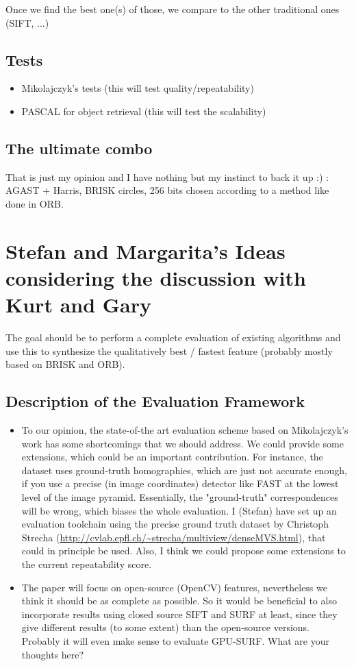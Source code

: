 \documentclass[a4paper,10pt]{article}
\begin{document}
Once we find the best one(s) of those, we compare to the other traditional ones
(SIFT, ...)

\subsection{Tests}

\begin{itemize}
 \item Mikolajczyk's tests (this will test quality/repeatability)
 \item PASCAL for object retrieval (this will test the scalability)
\end{itemize}


\subsection{The ultimate combo}

That is just my opinion and I have nothing but my instinct to back it up :) :
AGAST + Harris, BRISK circles, 256 bits chosen according to a method like done in ORB.

\section{Stefan and Margarita's Ideas considering the discussion with Kurt and Gary}
The goal should be to perform a complete evaluation of existing algorithms and use this to synthesize the qualitatively best / fastest feature (probably mostly based on BRISK and ORB).
\subsection{Description of the Evaluation Framework}
\begin{itemize}
\item To our opinion, the state-of-the art evaluation scheme based on Mikolajczyk's work has some shortcomings that we should address. We could provide some extensions, which could be an important contribution. For instance, the dataset uses ground-truth homographies, which are just not accurate enough, if you use a precise (in image coordinates) detector like FAST at the lowest level of the image pyramid. Essentially, the "ground-truth" correspondences will be wrong, which biases the whole evaluation. I (Stefan) have set up an evaluation toolchain using the precise ground truth dataset by Christoph Strecha (\url{http://cvlab.epfl.ch/~strecha/multiview/denseMVS.html}), that could in principle be used. Also, I think we could propose some extensions to the current repeatability score.
\item The paper will focus on open-source (OpenCV) features, nevertheless we think it should be as complete as possible. So it would be beneficial to also incorporate results using closed source SIFT and SURF at least, since they give different results (to some extent) than the open-source versions. Probably it will even make sense to evaluate GPU-SURF. What are your thoughts here? 
\end{itemize}
\end{document}
